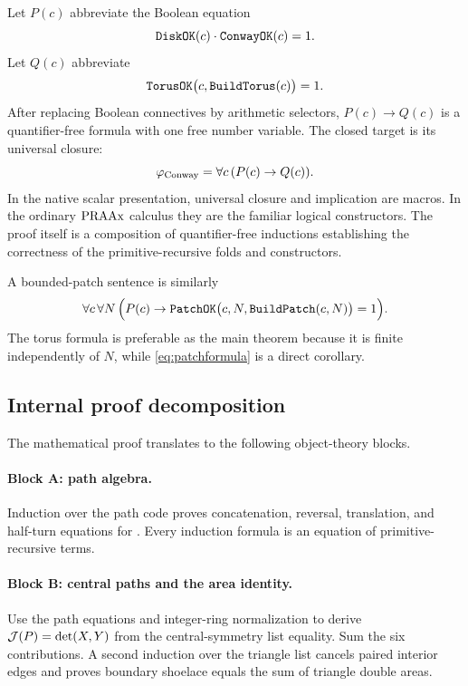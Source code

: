 Let \(P(c)\) abbreviate the Boolean equation
\[
 \texttt{DiskOK}(c)\cdot\texttt{ConwayOK}(c)=1.
\]
Let \(Q(c)\) abbreviate
\[
 \texttt{TorusOK}\bigl(c,\texttt{BuildTorus}(c)\bigr)=1.
\]
After replacing Boolean connectives by arithmetic selectors, \(P(c)\to Q(c)\) is a quantifier-free formula with one free number variable.  The closed target is its universal closure:
\begin{equation}
 \varphi_{\rm Conway}=\forall c\,(P(c)\to Q(c)).
 \label{eq:conwayformula}
\end{equation}
In the native scalar presentation, universal closure and implication are macros.  In the ordinary \(\mathrm{PRAAx}\) calculus they are the familiar logical constructors.  The proof itself is a composition of quantifier-free inductions establishing the correctness of the primitive-recursive folds and constructors.

A bounded-patch sentence is similarly
\begin{equation}
 \forall c\,\forall N\,\Bigl(P(c)\to
 \texttt{PatchOK}\bigl(c,N,\texttt{BuildPatch}(c,N)\bigr)=1\Bigr).
 \label{eq:patchformula}
\end{equation}
The torus formula is preferable as the main theorem because it is finite independently of \(N\), while \cref{eq:patchformula} is a direct corollary.

\subsection{Internal proof decomposition}

The mathematical proof translates to the following object-theory blocks.

\paragraph{Block A: path algebra.}
Induction over the path code proves concatenation, reversal, translation, and half-turn equations for .  Every induction formula is an equation of primitive-recursive terms.

\paragraph{Block B: central paths and the area identity.}
Use the path equations and integer-ring normalization to derive \(\mathcal J(P)=\det(X,Y)\) from the central-symmetry list equality.  Sum the six contributions.  A second induction over the triangle list cancels paired interior edges and proves boundary shoelace equals the sum of triangle double areas.

